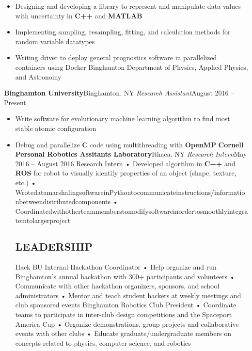 \documentclass[11pt]{article}
\begin{document}
\begin{itemize}
	\item Designing and developing a library to represent and manipulate data values with uncertainty in \textbf{C++} and \textbf{MATLAB}
	\item Implementing sampling, resampling, fitting, and calculation methods for random variable datatypes
	\item Writing driver to deploy general prognostics software in parallelized containers using Docker Binghamton Department of Physics, Applied Physics, and Astronomy
\end{itemize}
\textbf{Binghamton University}\hfill Binghamton. NY
\textit{Research Assistant}\hfill August 2016 – Present
\begin{itemize}
	\item Write software for evolutionary machine learning algorithm to find most stable atomic configuration
	\item Debug and parallelize \textbf{C} code using multithreading with \textbf{OpenMP}
\textbf{Cornell Personal Robotics Assitants Laboratory}\hfill Ithaca. NY
\textit{Research Intern}\hfill May 2016 – August 2016
Research Intern
• Developed algorithm in \textbf{C++} and \textbf{ROS} for robot to visually identify properties of an object (shape, texture, etc.)
• WrotedatamarshalingsoftwareinPythontocommunicateinstructions/informationbetweendistributedcomponents • Coordinatedwithotherteammemberstomodifysoftwareinordertosmoothlyintegrateintolargerproject
\vspace{4mm}

\subsection*{LEADERSHIP}
\vspace{1mm}
\spacedhrule{0.1em}{0.9em}
Hack BU
Internal Hackathon Coordinator
• Help organize and run Binghamton’s annual hackathon with 300+ participants and volunteers
• Communicate with other hackathon organizers, sponsors, and school administrators
• Mentor and teach student hackers at weekly meetings and club sponsored events Binghamton Robotics Club
President
• Coordinate teams to participate in inter-club design competitions and the Spaceport America Cup
• Organize demonstrations, group projects and collaborative events with other clubs
• Educate graduate/undergraduate members on concepts related to physics, computer science, and robotics
\vspace{4mm}


\end{itemize}
\end{document}

